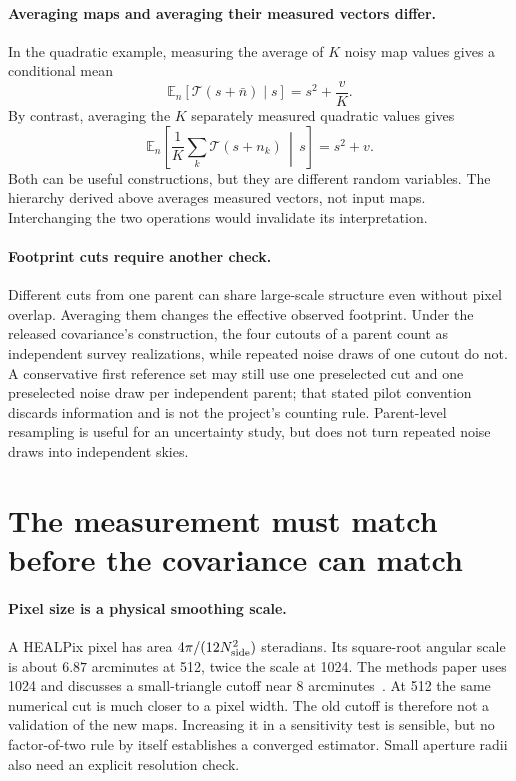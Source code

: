 \documentclass[11pt]{article}
\newcommand{\E}{\mathbb{E}}
\begin{document}
\paragraph{Averaging maps and averaging their measured vectors differ.}
In the quadratic example, measuring the average of $K$ noisy map values
gives a conditional mean
\begin{equation}
 \E_n[\mathcal T(s+\bar n)\mid s]=s^2+\frac vK.
\end{equation}
By contrast, averaging the $K$ separately measured quadratic values gives
\begin{equation}
 \E_n\left[\frac1K\sum_k\mathcal T(s+n_k)\,\middle|\,s\right]
                       =s^2+v.
\end{equation}
Both can be useful constructions, but they are different random variables.
The hierarchy derived above averages measured vectors, not input maps.
Interchanging the two operations would invalidate its interpretation.

\paragraph{Footprint cuts require another check.}
Different cuts from one parent can share large-scale structure even without
pixel overlap. Averaging them changes the effective observed footprint.
Under the released covariance's construction, the four cutouts of a parent
count as independent survey realizations, while repeated noise draws of
one cutout do not. A conservative first reference set may still use one
preselected cut and one preselected noise draw per independent parent;
that stated pilot convention discards information and is not the
project's counting rule. Parent-level resampling is useful for an
uncertainty study, but does not turn repeated noise draws into
independent skies.

\section{The measurement must match before the covariance can match}
\paragraph{Pixel size is a physical smoothing scale.}
A HEALPix pixel has area $4\pi/(12N_{\rm side}^2)$ steradians. Its square-root
angular scale is about $6.87$ arcminutes at 512, twice the scale at 1024.
The methods paper uses 1024 and discusses a small-triangle cutoff near
8 arcminutes~\cite{gomes}. At 512 the same numerical cut is much closer to
a pixel width. The old cutoff is therefore not a validation of the new maps.
Increasing it in a sensitivity test is sensible, but no factor-of-two rule
by itself establishes a converged estimator. Small aperture radii also need
an explicit resolution check.
\end{document}
